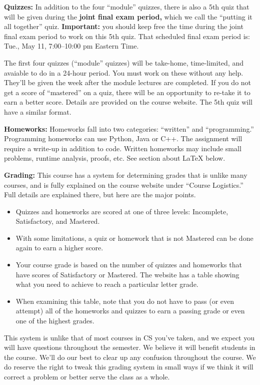 \documentclass[12pt]{article}
\begin{document}
\textbf{Quizzes:} In addition to the four ``module'' quizzes, there is also a 5th quiz that will be given during the {\bf joint final exam period,} which we call the ``putting it all together'' quiz. {\bf Important:} you should keep  free the time during the joint final exam period to work on this 5th quiz. That scheduled final exam period is: Tue., May 11, 7:00--10:00 pm Eastern Time.

The first four quizzes (``module'' quizzes) will be take-home, time-limited, and avaiable to do in a 24-hour period. You must work on these without any help.  They'll be given the week after the module lectures are completed. If you do not get a score of ``mastered'' on a quiz, there will be an opportunity to re-take it to earn a better score. Details are provided on the course website.  The 5th quiz will have a similar format.

\textbf{Homeworks:} Homeworks fall into two categories:  ``written'' and ``programming.'' Programming homeworks can use Python, Java or C++. The assignment will require a write-up in addition to code.  Written homeworks may include small problems, runtime analysis, proofs, etc.   See section about \LaTeX{} below.

\textbf{Grading:} This course has a system for determining grades that is unlike many courses, and is fully explained on the course website under ``Course Logistics.'' Full details are explained there, but here are the major points.
\begin{itemize}
    \item Quizzes and homeworks are scored at one of three levels:  Incomplete, Satisfactory, and Mastered.
    \item With some limitations, a quiz or homework that is not Mastered can be done again to earn a higher score.
    \item Your course grade is based on the number of quizzes and homeworks that have scores of Satisfactory or Mastered. The website has a table showing what you need to achieve to reach a particular letter grade.
    \item When examining this table, note that you do not have to pass (or even attempt) all of the homeworks and quizzes to earn a passing grade or even one of the highest grades.
\end{itemize}
This system is unlike that of most courses in CS you've taken, and we expect you will have questions throughout the semester. We believe it will benefit students in the course. We'll do our best to clear up any confusion throughout the course. We do reserve the right to tweak this grading system in small ways if we think it will correct a problem or better serve the class as a whole.
\end{document}
